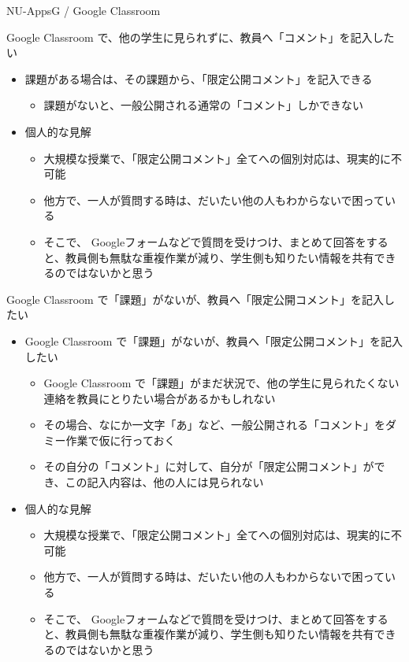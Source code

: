 \documentclass[a4j,10pt]{jsarticle}
\begin{document}
{\begin{frame}[label={sec:org25495ab},fragile]{NU-AppsG / Google Classroom}
\begin{block}{Google Classroom で、他の学生に見られずに、教員へ「コメント」を記入したい}
\begin{itemize}
\begin{itemize}
個々の質問（課題から可能） (課題については、宛先を教員に限定した質問をすることができます。)
\end{itemize}
\par
\item 課題がある場合は、その課題から、「限定公開コメント」を記入できる
\begin{itemize}
\item 課題がないと、一般公開される通常の「コメント」しかできない
\end{itemize}
\par
\item 個人的な見解
\begin{itemize}
\item 大規模な授業で、「限定公開コメント」全てへの個別対応は、現実的に不可能
\item 他方で、一人が質問する時は、だいたい他の人もわからないで困っている
\item そこで、 Googleフォームなどで質問を受けつけ、まとめて回答をすると、教員側も無駄な重複作業が減り、学生側も知りたい情報を共有できるのではないかと思う
\end{itemize}
\end{itemize}
\end{block}
\par
\begin{block}{Google Classroom で「課題」がないが、教員へ「限定公開コメント」を記入したい}
\begin{itemize}
\item Google Classroom で「課題」がないが、教員へ「限定公開コメント」を記入したい
\begin{itemize}
\item Google Classroom で「課題」がまだ状況で、他の学生に見られたくない連絡を教員にとりたい場合があるかもしれない
\item その場合、なにか一文字「あ」など、一般公開される「コメント」をダミー作業で仮に行っておく
\item その自分の「コメント」に対して、自分が「限定公開コメント」ができ、この記入内容は、他の人には見られない
\end{itemize}
\par
\item 個人的な見解
\begin{itemize}
\item 大規模な授業で、「限定公開コメント」全てへの個別対応は、現実的に不可能
\item 他方で、一人が質問する時は、だいたい他の人もわからないで困っている
\item そこで、 Googleフォームなどで質問を受けつけ、まとめて回答をすると、教員側も無駄な重複作業が減り、学生側も知りたい情報を共有できるのではないかと思う

\end{itemize}
\end{itemize}
\end{block}
\end{frame}}
\end{document}
